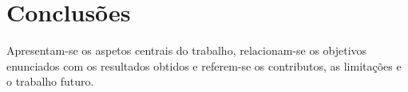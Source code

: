 \chapter*{Conclusões}

Apresentam-se os aspetos centrais do trabalho, relacionam-se os objetivos
enunciados com os resultados obtidos e referem-se os contributos, as limitações
e o trabalho futuro.

\lipsum[7]
